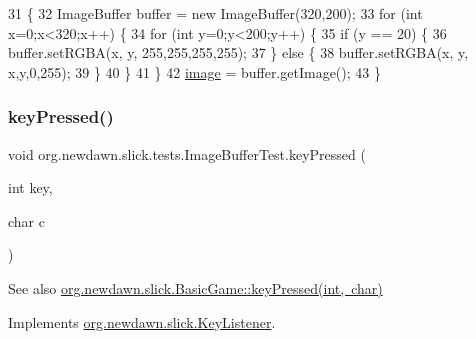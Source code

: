 \begin{DoxyCode}
31                                                                     \{
32         ImageBuffer buffer = \textcolor{keyword}{new} ImageBuffer(320,200);
33         \textcolor{keywordflow}{for} (\textcolor{keywordtype}{int} x=0;x<320;x++) \{
34             \textcolor{keywordflow}{for} (\textcolor{keywordtype}{int} y=0;y<200;y++) \{
35                 \textcolor{keywordflow}{if} (y == 20) \{
36                     buffer.setRGBA(x, y, 255,255,255,255);
37                 \} \textcolor{keywordflow}{else} \{
38                     buffer.setRGBA(x, y, x,y,0,255);
39                 \}
40             \}
41         \}
42         \mbox{\hyperlink{classorg_1_1newdawn_1_1slick_1_1tests_1_1_image_buffer_test_afde40a9c63dc29ce4951b86e0a721c8a}{image}} = buffer.getImage();
43     \}
\end{DoxyCode}
\mbox{\label{classorg_1_1newdawn_1_1slick_1_1tests_1_1_image_buffer_test_afd3aca2a853b70ccf8154376865bc287}} 
\subsubsection{\texorpdfstring{key\+Pressed()}{keyPressed()}}
{\footnotesize\ttfamily void org.\+newdawn.\+slick.\+tests.\+Image\+Buffer\+Test.\+key\+Pressed (\begin{DoxyParamCaption}\item[{int}]{key,  }\item[{char}]{c }\end{DoxyParamCaption})\hspace{0.3cm}{\ttfamily [inline]}}

\begin{DoxySeeAlso}{See also}
\mbox{\hyperlink{classorg_1_1newdawn_1_1slick_1_1_basic_game_a4fbb3345b5abf5ddd54a99466d07f02f}{org.\+newdawn.\+slick.\+Basic\+Game\+::key\+Pressed(int, char)}} 
\end{DoxySeeAlso}


Implements \mbox{\hyperlink{interfaceorg_1_1newdawn_1_1slick_1_1_key_listener_ac0b0568a21ef486c4f51382614c196ef}{org.\+newdawn.\+slick.\+Key\+Listener}}.


